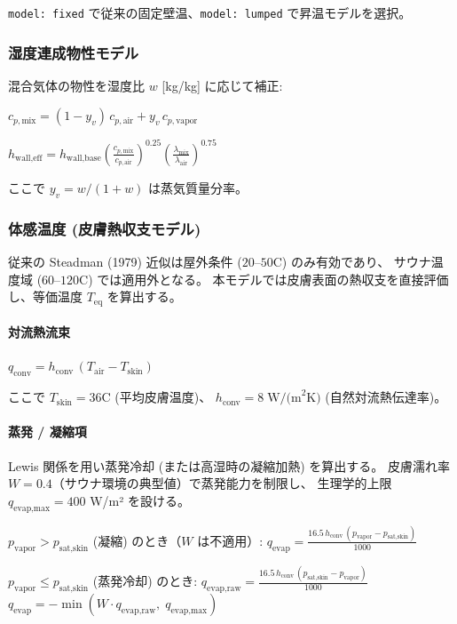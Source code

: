 \documentclass[a4paper,11pt]{article}
\begin{document}
\texttt{model: fixed} で従来の固定壁温、\texttt{model: lumped} で昇温モデルを選択。

\subsubsection{湿度連成物性モデル}

混合気体の物性を湿度比 $w$ [kg/kg] に応じて補正:

$
c_{p,\text{mix}} = (1 - y_v) \, c_{p,\text{air}} + y_v \, c_{p,\text{vapor}}
$

$
h_{\text{wall,eff}} = h_{\text{wall,base}} \left(\frac{c_{p,\text{mix}}}{c_{p,\text{air}}}\right)^{0.25} \left(\frac{\lambda_{\text{mix}}}{\lambda_{\text{air}}}\right)^{0.75}
$

ここで $y_v = w / (1+w)$ は蒸気質量分率。

\subsubsection{体感温度 (皮膚熱収支モデル)}

従来の Steadman (1979) 近似は屋外条件 ($20$--$50$\textdegree C) のみ有効であり、
サウナ温度域 ($60$--$120$\textdegree C) では適用外となる。
本モデルでは皮膚表面の熱収支を直接評価し、等価温度 $T_{\text{eq}}$ を算出する。

\paragraph{対流熱流束}
$
q_{\text{conv}} = h_{\text{conv}} \, (T_{\text{air}} - T_{\text{skin}})
$

ここで $T_{\text{skin}} = 36$\textdegree C (平均皮膚温度)、
$h_{\text{conv}} = 8 \; \text{W/(m}^2\text{K)}$ (自然対流熱伝達率)。

\paragraph{蒸発 / 凝縮項}
Lewis 関係を用い蒸発冷却 (または高湿時の凝縮加熱) を算出する。
皮膚濡れ率 $W = 0.4$（サウナ環境の典型値）で蒸発能力を制限し、
生理学的上限 $q_{\text{evap,max}} = 400$ W/m² を設ける。

$p_{\text{vapor}} > p_{\text{sat,skin}}$ (凝縮) のとき（$W$ は不適用）:
$
q_{\text{evap}} = \frac{16.5 \, h_{\text{conv}} \, (p_{\text{vapor}} - p_{\text{sat,skin}})}{1000}
$

$p_{\text{vapor}} \leq p_{\text{sat,skin}}$ (蒸発冷却) のとき:
$
q_{\text{evap,raw}} = \frac{16.5 \, h_{\text{conv}} \, (p_{\text{sat,skin}} - p_{\text{vapor}})}{1000}
$
$
q_{\text{evap}} = -\min(W \cdot q_{\text{evap,raw}}, \; q_{\text{evap,max}})
$
\end{document}
